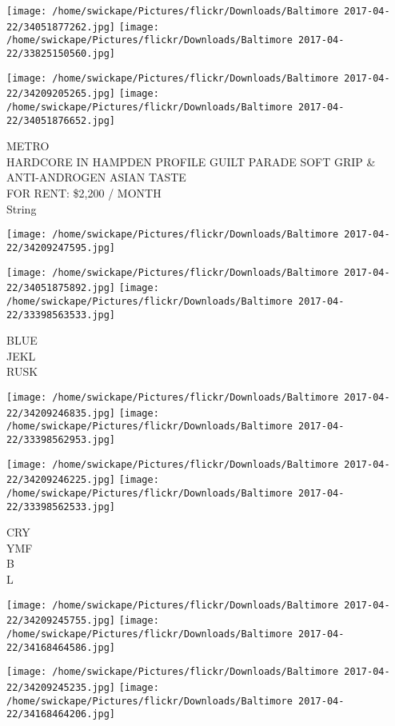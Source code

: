 \documentclass[10pt,letterpaper]{article}
\begin{document}
\texttt{[image: /home/swickape/Pictures/flickr/Downloads/Baltimore 2017-04-22/34051877262.jpg]}
\texttt{[image: /home/swickape/Pictures/flickr/Downloads/Baltimore 2017-04-22/33825150560.jpg]}

\texttt{[image: /home/swickape/Pictures/flickr/Downloads/Baltimore 2017-04-22/34209205265.jpg]}
\texttt{[image: /home/swickape/Pictures/flickr/Downloads/Baltimore 2017-04-22/34051876652.jpg]}

METRO\\
HARDCORE IN HAMPDEN PROFILE GUILT PARADE SOFT GRIP \& ANTI{-}ANDROGEN ASIAN TASTE\\
FOR RENT: \$2,200 / MONTH\\
String\\
\pagebreak

\texttt{[image: /home/swickape/Pictures/flickr/Downloads/Baltimore 2017-04-22/34209247595.jpg]}

\vspace{0.25in}
\texttt{[image: /home/swickape/Pictures/flickr/Downloads/Baltimore 2017-04-22/34051875892.jpg]}
\texttt{[image: /home/swickape/Pictures/flickr/Downloads/Baltimore 2017-04-22/33398563533.jpg]}

BLUE\\
JEKL\\
RUSK\\
\pagebreak

\texttt{[image: /home/swickape/Pictures/flickr/Downloads/Baltimore 2017-04-22/34209246835.jpg]}
\texttt{[image: /home/swickape/Pictures/flickr/Downloads/Baltimore 2017-04-22/33398562953.jpg]}

\texttt{[image: /home/swickape/Pictures/flickr/Downloads/Baltimore 2017-04-22/34209246225.jpg]}
\texttt{[image: /home/swickape/Pictures/flickr/Downloads/Baltimore 2017-04-22/33398562533.jpg]}

CRY\\
YMF\\
B\\
L\\
\pagebreak

\texttt{[image: /home/swickape/Pictures/flickr/Downloads/Baltimore 2017-04-22/34209245755.jpg]}
\texttt{[image: /home/swickape/Pictures/flickr/Downloads/Baltimore 2017-04-22/34168464586.jpg]}

\texttt{[image: /home/swickape/Pictures/flickr/Downloads/Baltimore 2017-04-22/34209245235.jpg]}
\texttt{[image: /home/swickape/Pictures/flickr/Downloads/Baltimore 2017-04-22/34168464206.jpg]}
\end{document}
